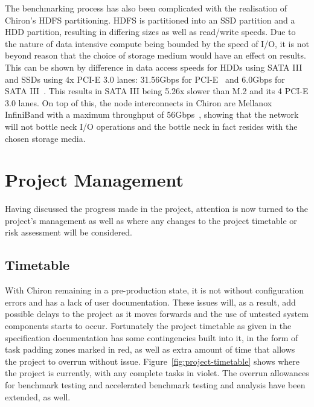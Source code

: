\documentclass[12pt,a4paper]{article}
\begin{document}
            The benchmarking process has also been complicated with the realisation of Chiron's HDFS partitioning. HDFS is partitioned into an SSD partition and a HDD partition, resulting in differing sizes as well as read/write speeds. Due to the nature of data intensive compute being bounded by the speed of I/O, it is not beyond reason that the choice of storage medium would have an effect on results. This can be shown by difference in data access speeds for HDDs using SATA III and SSDs using 4x PCI-E 3.0 lanes: 31.56Gbps for PCI-E~\cite{understanding-pcie} and 6.0Gbps for SATA III~\cite{sata-3-standard}. This results in SATA III being 5.26x slower than M.2 and its 4 PCI-E 3.0 lanes. On top of this, the node interconnects in Chiron are Mellanox InfiniBand with a maximum throughput of 56Gbps~\cite{mellanox-infiniband-manual}, showing that the network will not bottle neck I/O operations and the bottle neck in fact resides with the chosen storage media.
    
    \section{Project Management}
    \label{sec:project_management}

        Having discussed the progress made in the project, attention is now turned to the project's management as well as where any changes to the project timetable or risk assessment will be considered.
    
        \subsection{Timetable}
        \label{sub:timetable}

            With Chiron remaining in a pre-production state, it is not without configuration errors and has a lack of user documentation. These issues will, as a result, add possible delays to the project as it moves forwards and the use of untested system components starts to occur. Fortunately the project timetable as given in the specification documentation has some contingencies built into it, in the form of task padding zones marked in red, as well as extra amount of time that allows the project to overrun without issue. Figure~\ref{fig:project-timetable} shows where the project is currently, with any complete tasks in violet. The overrun allowances for benchmark testing and accelerated benchmark testing and analysis have been extended, as well.
\end{document}
